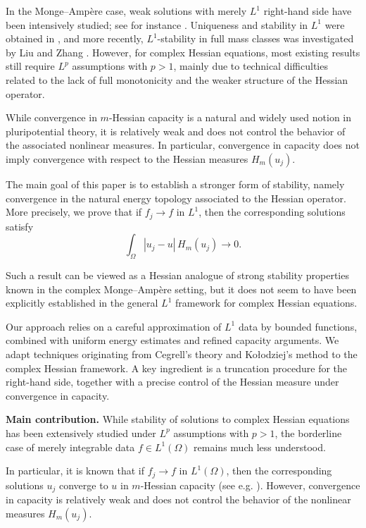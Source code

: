\documentclass[11pt,reqno]{amsart}
\theoremstyle{definition}
\theoremstyle{remark}
\begin{document}
	In the Monge--Ampère case, weak solutions with merely $L^1$ right-hand side
	have been intensively studied; see for instance
	\cite{DinewPlis,Liu-Zhang}.
	Uniqueness and stability in $L^1$ were obtained in \cite{DinewPlis},
	and more recently, $L^1$-stability in full mass classes
	was investigated by Liu and Zhang \cite{Liu-Zhang}.
	However, for complex Hessian equations, most existing results still require $L^p$ assumptions with $p>1$, mainly due to technical difficulties related to the lack of full monotonicity and the weaker structure of the Hessian operator.
	
	While convergence in $m$-Hessian capacity is a natural and widely used
	notion in pluripotential theory, it is relatively weak and does not
	control the behavior of the associated nonlinear measures.
	In particular, convergence in capacity does not imply convergence
	with respect to the Hessian measures $H_m(u_j)$.
	
	The main goal of this paper is to establish a stronger form of stability,
	namely convergence in the natural energy topology associated to the
	Hessian operator. More precisely, we prove that if $f_j \to f$ in $L^1$,
	then the corresponding solutions satisfy
	\[
	\int_\Omega |u_j-u|\, H_m(u_j) \to 0.
	\]
	
	Such a result can be viewed as a Hessian analogue of strong stability
	properties known in the complex Monge--Ampère setting,
	but it does not seem to have been explicitly established in the
	general $L^1$ framework for complex Hessian equations.
	
	
	
	Our approach relies on a careful approximation of $L^1$ data by bounded functions, combined with uniform energy estimates and refined capacity arguments.
	We adapt techniques originating from Cegrell's theory and Ko\l odziej's method to the complex Hessian framework.
	A key ingredient is a truncation procedure for the right-hand side, together with a precise control of the Hessian measure under convergence in capacity.
	
	\medskip
	\noindent
	\textbf{Main contribution.}
	While stability of solutions to complex Hessian equations has been extensively studied under $L^p$ assumptions with $p>1$, the borderline case of merely integrable data $f \in L^1(\Omega)$ remains much less understood.
	
	In particular, it is known that if $f_j \to f$ in $L^1(\Omega)$, then the corresponding solutions $u_j$ converge to $u$ in $m$-Hessian capacity (see e.g. \cite{V T Nguyen}). However, convergence in capacity is relatively weak and does not control the behavior of the nonlinear measures $H_m(u_j)$.
	
\end{document}
